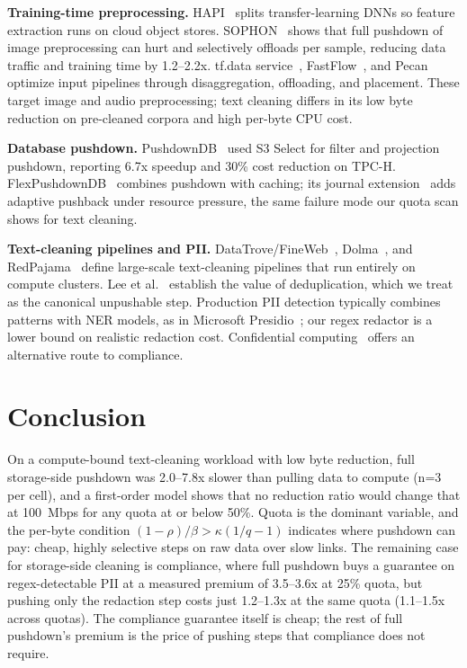 \documentclass[11pt]{article}
\begin{document}
\textbf{Training-time preprocessing.} HAPI~\cite{petrescu2024hapi} splits transfer-learning DNNs so feature extraction runs on cloud object stores. SOPHON~\cite{wang2024sophon} shows that full pushdown of image preprocessing can hurt and selectively offloads per sample, reducing data traffic and training time by 1.2--2.2x. tf.data service~\cite{audibert2023tfdata}, FastFlow~\cite{um2023fastflow}, and Pecan~\cite{graur2024pecan} optimize input pipelines through disaggregation, offloading, and placement. These target image and audio preprocessing; text cleaning differs in its low byte reduction on pre-cleaned corpora and high per-byte CPU cost.

\textbf{Database pushdown.} PushdownDB~\cite{yu2020pushdowndb} used S3 Select for filter and projection pushdown, reporting 6.7x speedup and 30\% cost reduction on TPC-H. FlexPushdownDB~\cite{yang2021flexpushdowndb} combines pushdown with caching; its journal extension~\cite{yang2024flexpushdowndb} adds adaptive pushback under resource pressure, the same failure mode our quota scan shows for text cleaning.

\textbf{Text-cleaning pipelines and PII.} DataTrove/FineWeb~\cite{penedo2024fineweb}, Dolma~\cite{soldaini2024dolma}, and RedPajama~\cite{weber2024redpajama} define large-scale text-cleaning pipelines that run entirely on compute clusters. Lee et al.~\cite{lee2022dedup} establish the value of deduplication, which we treat as the canonical unpushable step. Production PII detection typically combines patterns with NER models, as in Microsoft Presidio~\cite{microsoft2024presidio}; our regex redactor is a lower bound on realistic redaction cost. Confidential computing~\cite{costan2016sgx} offers an alternative route to compliance.

\section{Conclusion}
\label{sec:conclusion}

On a compute-bound text-cleaning workload with low byte reduction, full storage-side pushdown was 2.0--7.8x slower than pulling data to compute (n=3 per cell), and a first-order model shows that no reduction ratio would change that at 100~Mbps for any quota at or below 50\%. Quota is the dominant variable, and the per-byte condition $(1 - \rho)/\beta > \kappa(1/q - 1)$ indicates where pushdown can pay: cheap, highly selective steps on raw data over slow links. The remaining case for storage-side cleaning is compliance, where full pushdown buys a guarantee on regex-detectable PII at a measured premium of 3.5--3.6x at 25\% quota, but pushing only the redaction step costs just 1.2--1.3x at the same quota (1.1--1.5x across quotas). The compliance guarantee itself is cheap; the rest of full pushdown's premium is the price of pushing steps that compliance does not require.
\end{document}
